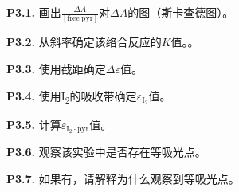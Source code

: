 \noindent\textbf{P3.1.}
画出\(\frac{\Delta A}{[\mathrm{free\ pyr}]}\)对\(\Delta A\)的图（斯卡查德图）。

\noindent\textbf{P3.2.} 从斜率确定该络合反应的\(K\)值。。

\noindent\textbf{P3.3.} 使用截距确定\(\Delta\varepsilon\)值。

\noindent\textbf{P3.4.}
使用I\textsubscript{2}的吸收带确定\(\varepsilon_{\mathrm{I_2}}\)值。

\noindent\textbf{P3.5.} 计算\(\varepsilon_{\mathrm{I_2\cdot pyr}}\)值。

\noindent\textbf{P3.6.} 观察该实验中是否存在等吸光点。

\noindent\textbf{P3.7.} 如果有，请解释为什么观察到等吸光点。
